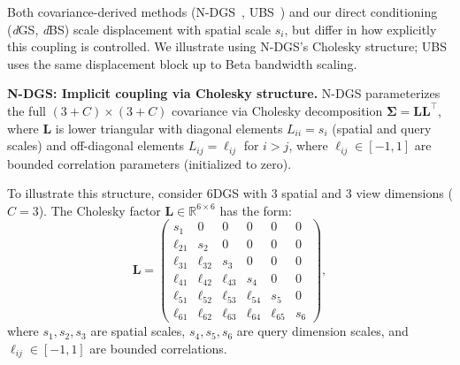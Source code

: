 \documentclass{article}
\newcommand{\dgs}{\textit{d}GS\xspace}
\newcommand{\dbs}{\textit{d}BS\xspace}
\theoremstyle{plain}
\theoremstyle{definition}
\theoremstyle{remark}
\begin{document}
Both covariance-derived methods (N-DGS~\citep{gao20246dgs,gao20257dgs}, UBS~\citep{liu2025universal}) and our direct conditioning (\dgs{}, \dbs{}) scale displacement with spatial scale $s_i$, but differ in how explicitly this coupling is controlled. We illustrate using N-DGS's Cholesky structure; UBS uses the same displacement block up to Beta bandwidth scaling.

\textbf{N-DGS: Implicit coupling via Cholesky structure.} N-DGS parameterizes the full $(3+C) \times (3+C)$ covariance via Cholesky decomposition $\boldsymbol{\Sigma} = \mathbf{L}\mathbf{L}^\top$, where $\mathbf{L}$ is lower triangular with diagonal elements $L_{ii} = s_i$ (spatial and query scales) and off-diagonal elements $L_{ij} = \ell_{ij}$ for $i > j$, where $\ell_{ij} \in [-1,1]$ are bounded correlation parameters (initialized to zero).

To illustrate this structure, consider 6DGS with 3 spatial and 3 view dimensions ($C=3$). The Cholesky factor $\mathbf{L} \in \mathbb{R}^{6 \times 6}$ has the form:
\begin{equation}
\mathbf{L} = \left(\begin{array}{rrrrrr}
       s_1 &        0 &        0 &        0 &        0 &        0 \\
\ell_{21} &       s_2 &        0 &        0 &        0 &        0 \\
\ell_{31} & \ell_{32} &       s_3 &        0 &        0 &        0 \\
\ell_{41} & \ell_{42} & \ell_{43} &       s_4 &        0 &        0 \\
\ell_{51} & \ell_{52} & \ell_{53} & \ell_{54} &       s_5 &        0 \\
\ell_{61} & \ell_{62} & \ell_{63} & \ell_{64} & \ell_{65} &       s_6
\end{array}\right),
\end{equation}
where $s_1, s_2, s_3$ are spatial scales, $s_4, s_5, s_6$ are query dimension scales, and $\ell_{ij} \in [-1,1]$ are bounded correlations.
\end{document}
